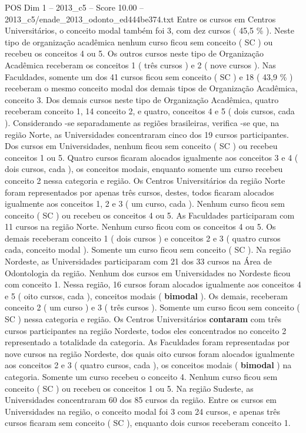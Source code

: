 \begin{textsample}{POS Dim 1 – 2013\_c5 – Score 10.00 – 2013\_c5/enade\_2013\_odonto\_ed444be374.txt}
Entre os cursos em Centros Universitários, o conceito modal também foi 3, com dez cursos ( 45,5 \% ).
Neste tipo de organização acadêmica nenhum curso ficou sem conceito ( SC ) ou recebeu os conceitos 4 ou 5.
Os outros cursos neste tipo de Organização Acadêmica receberam os conceitos 1 ( três cursos ) e 2 ( nove cursos ).
Nas Faculdades, somente um dos 41 cursos ficou sem conceito ( SC ) e 18 ( 43,9 \% ) receberam o mesmo conceito modal dos demais tipos de Organização Acadêmica, conceito 3.
Dos demais cursos neste tipo de Organização Acadêmica, quatro receberam conceito 1, 14 conceito 2, e quatro, conceitos 4 e 5 ( dois cursos, cada ).
Considerando -se separadamente as regiões brasileiras, verifica -se que, na região Norte, as Universidades concentraram cinco dos 19 cursos participantes.
Dos cursos em Universidades, nenhum ficou sem conceito ( SC ) ou recebeu conceitos 1 ou 5.
Quatro cursos ficaram alocados igualmente aos conceitos 3 e 4 ( dois cursos, cada ), os conceitos modais, enquanto somente um curso recebeu conceito 2 nessa categoria e região.
Os Centros Universitários da região Norte foram representados por apenas três cursos, destes, todos ficaram alocados igualmente aos conceitos 1, 2 e 3 ( um curso, cada ).
Nenhum curso ficou sem conceito ( SC ) ou recebeu os conceitos 4 ou 5.
As Faculdades participaram com 11 cursos na região Norte.
Nenhum curso ficou com os conceitos 4 ou 5.
Os demais receberam conceito 1 ( dois cursos ) e conceitos 2 e 3 ( quatro cursos cada, conceito modal ).
Somente um curso ficou sem conceito ( SC ).
Na região Nordeste, as Universidades participaram com 21 dos 33 cursos na Área de Odontologia da região.
Nenhum dos cursos em Universidades no Nordeste ficou com conceito 1.
Nessa região, 16 cursos foram alocados igualmente aos conceitos 4 e 5 ( oito cursos, cada ), conceitos modais ( \textbf{bimodal} ).
Os demais, receberam conceito 2 ( um curso ) e 3 ( três cursos ).
Somente um curso ficou sem conceito ( SC ) nessa categoria e região.
Os Centros Universitários \textbf{contaram} com três cursos participantes na região Nordeste, todos eles concentrados no conceito 2 representado a totalidade da categoria.
As Faculdades foram representadas por nove cursos na região Nordeste, dos quais oito cursos foram alocados igualmente aos conceitos 2 e 3 ( quatro cursos, cada ), os conceitos modais ( \textbf{bimodal} ) na categoria.
Somente um curso recebeu o conceito 4.
Nenhum curso ficou sem conceito ( SC ) ou recebeu os conceitos 1 ou 5.
Na região Sudeste, as Universidades concentraram 60 dos 85 cursos da região.
Entre os cursos em Universidades na região, o conceito modal foi 3 com 24 cursos, e apenas três cursos ficaram sem conceito ( SC ), enquanto dois cursos receberam conceito 1.

\end{textsample}
